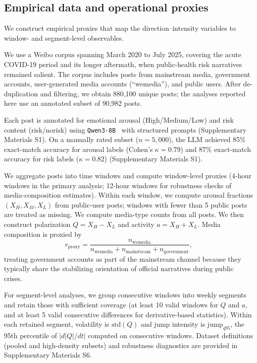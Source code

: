 \documentclass[12pt]{article}
\begin{document}
\subsection{Empirical data and operational proxies}
We construct empirical proxies that map the direction--intensity variables to window- and segment-level observables.

We use a Weibo corpus spanning March 2020 to July 2025, covering the acute COVID-19 period and its longer aftermath, when public-health risk narratives remained salient. The corpus includes posts from mainstream media, government accounts, user-generated media accounts (``wemedia''), and public users. After de-duplication and filtering, we obtain 880,100 unique posts; the analyses reported here use an annotated subset of 90,982 posts.

Each post is annotated for emotional arousal (High/Medium/Low) and risk content (risk/norisk) using \texttt{Qwen3-8B}~\cite{Qwen3_8B} with structured prompts (Supplementary Materials S1). On a manually rated subset ($n=5{,}000$), the LLM achieved 85\% exact-match accuracy for arousal labels (Cohen's $\kappa=0.79$) and 87\% exact-match accuracy for risk labels ($\kappa=0.82$) (Supplementary Materials S1).

We aggregate posts into time windows and compute window-level proxies (4-hour windows in the primary analysis; 12-hour windows for robustness checks of media-composition estimates). Within each window, we compute arousal fractions $(X_H,X_M,X_L)$ from public-user posts; windows with fewer than 5 public posts are treated as missing. We compute media-type counts from all posts. We then construct polarization $Q=X_H-X_L$ and activity $a=X_H+X_L$. Media composition is proxied by
\begin{equation}
r_{\text{proxy}}=\frac{n_{\text{wemedia}}}{n_{\text{wemedia}}+n_{\text{mainstream}}+n_{\text{government}}},
\label{eq:rproxy}
\end{equation}
treating government accounts as part of the mainstream channel because they typically share the stabilizing orientation of official narratives during public crises.

For segment-level analyses, we group consecutive windows into weekly segments and retain those with sufficient coverage (at least 10 valid windows for $Q$ and $a$, and at least 5 valid consecutive differences for derivative-based statistics). Within each retained segment, volatility is $\text{std}(Q)$ and jump intensity is $\text{jump}_{q95}$, the 95th percentile of $|d|Q|/dt|$ computed on consecutive windows. Dataset definitions (pooled and high-density subsets) and robustness diagnostics are provided in Supplementary Materials S6.
\end{document}
